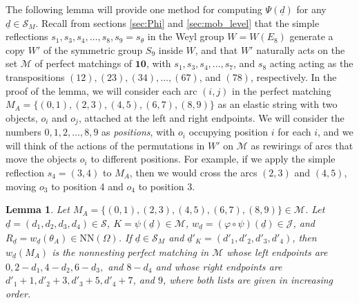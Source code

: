 \documentclass[10pt,a4paper]{amsart}
\newtheorem{lemma}[theorem]{Lemma}
\numberwithin{equation}{section}
\newcommand{\seqd}{\underline{d}}
\newcommand{\calj}{\mathcal{J}}
\newcommand{\calm}{\mathcal{M}}
\newcommand{\cals}{\mathcal{S}}
\newcommand{\ten}{\mathbf{10}}
\newcommand{\ob}{\Omega}
\newcommand{\nn}{\mathrm{NN}}
\begin{document}
The following lemma will provide one method for computing $\Psi(\seqd)$ for any
$\seqd\in \cals_M$. Recall from sections \ref{sec:Phi} and \ref{sec:mob_level} that
the simple reflections $s_1, s_3, s_4, \dots, s_8, s_9=s_\theta$ in the Weyl
group $W=W(E_8)$ generate a copy $W'$ of the symmetric group $S_9$ inside $W$,
and that $W'$ naturally acts on the set $\calm$ of perfect matchings of $\ten$,
with $s_1, s_3, s_4, \dots, s_7$, and $s_8$ acting acting as the transpositions
$(12), (23), (34),\dots, (67)$, and $(78)$, respectively.  In the proof of the
 lemma, we will consider each arc $(i,j)$ in the perfect matching
$M_A=\{(0,1),(2,3), (4,5), (6,7), (8,9)\}$ as an elastic string with two
objects, $o_i$ and $o_j$, attached at the left and right endpoints.
We will consider the numbers $0,1,2,\dots, 8,9$ as \emph{positions}, with $o_i$
occupying position $i$ for each $i$, and we will think of the actions of the
permutations in $W'$ on $\calm$ as rewirings of arcs that move the objects $o_i$
to different positions. For example, if we apply the simple reflection
$s_4=(3,4)$ to $M_A$, then we would cross the arcs $(2,3)$ and $(4,5)$, moving
$o_3$ to position 4 and $o_4$ to position 3. 


\begin{lemma}
\label{lem:lr}
Let $M_A=\{(0,1),(2,3), (4,5), (6,7), (8,9)\}\in
\calm$. Let $\seqd=(d_1,d_2,d_3,d_4)\in \cals$, $K=\psi(\seqd)\in \calm$,
$w_{\seqd}=(\varphi\circ\psi)(\seqd)\in \calj$, and $R_{\seqd}=w_{\seqd}(\theta_A)\in \nn(\ob)$. If
$\seqd\in\cals_M$ and $\seqd'_K=(d'_1,d'_2,d'_3,d'_4)$, then $w_{\seqd}(M_A)$ is the
nonnesting perfect matching in $\calm$ whose left endpoints are
$0,2-d_1,4-d_2,6-d_3,$ and $8-d_4$ and whose right endpoints are $d'_1+1,
d'_2+3, d'_3+5, d'_4+7$, and $9$, where both lists are given in increasing
order. 
\end{lemma}
\end{document}

